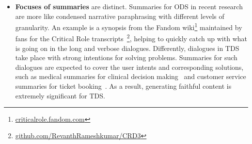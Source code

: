 \begin{itemize}
\item \textbf{Focuses of summaries} are distinct. Summaries for ODS in recent research are more like condensed narrative paraphrasing with different levels of granularity. An example is a synopsis from the Fandom wiki\footnote{\url{criticalrole.fandom.com}} maintained by fans for the Critical Role transcripts~\footnote{\url{github.com/RevanthRameshkumar/CRD3}}\cite{rameshkumar2020storytelling}, helping to quickly catch up with what is going on in the long and verbose dialogues. Differently, dialogues in TDS take place with strong intentions for solving problems. Summaries for such dialogues are expected to cover the user intents and corresponding solutions, such as medical summaries for clinical decision making~\cite{joshi2020dr} and customer service summaries for ticket booking~\cite{zhao2021todsum}. As a result, generating faithful content is extremely significant for TDS. %
\end{itemize}

